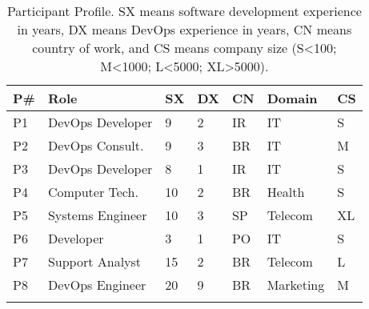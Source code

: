\begin{table}[t]
\centering
\caption{Participant Profile. SX means software development experience in years,
DX means DevOps experience in years, CN means country of work, and CS means
company size (S\textless100; M\textless1000; L\textless5000; XL\textgreater5000).}
\label{participant_table}
\begin{tabular}{p{0.4cm}p{2.6cm}p{0.4cm}p{0.45cm}p{0.5cm}p{1.3cm}p{0.3cm}} \toprule \centering
\textbf{P\#}          & \textbf{Role}
       & \textbf{SX} & \textbf{DX} & \textbf{CN}   & \textbf{Domain}    & \multicolumn{1}{l}{\textbf{CS}} \\ \midrule \centering
P1                   & DevOps Developer      & 9            & 2           & IR            & IT                 & S                               \\ \centering

P2                   & DevOps Consult.       & 9            & 3           & BR            & IT                 & M                               \\ \centering

P3                   & DevOps Developer      & 8            & 1           & IR            & IT                 & S                               \\ \centering

P4                   & Computer Tech.        & 10           & 2           & BR            & Health             & S                               \\ \centering

P5                   & Systems Engineer      & 10           & 3           & SP            & Telecom            & XL                              \\ \centering

P6                   & Developer             & 3            & 1           & PO            & IT                 & S                               \\ \centering

P7                   & Support Analyst       & 15           & 2           & BR            & Telecom            & L                               \\ \centering

P8                   & DevOps Engineer       & 20           & 9           & BR            & Marketing              & M                               \\ \centering


\end{tabular}
\end{table}
